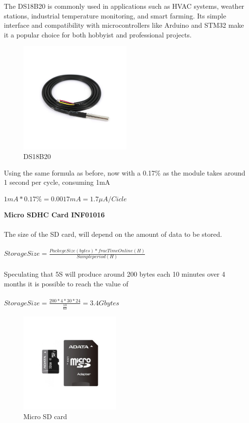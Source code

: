 The DS18B20 is commonly used in applications such as HVAC systems, weather
stations, industrial temperature monitoring, and smart farming. Its simple 
interface and compatibility with microcontrollers like Arduino and STM32 
make it a popular choice for both hobbyist and professional projects.

\begin{figure}[H]
    \centering
    \includegraphics[width=0.5\textwidth]{images/chapter/design/components/temp.png}  %
    \caption{DS18B20}
    \label{fig:DS18B20}        
\end{figure}

Using the same formula as before, now with a 0.17\% as the module takes around 1 second per cycle, consuming 1mA

\(1mA*0.17\% = 0.0017mA = 1.7\mu A/Cicle \)

\textbf{Micro SDHC Card INF01016}\\\\
The size  of the SD card, will depend on the amount of data to be stored.
\\\\
\( Storage Size = \frac{Packege Size(bytes) * frac Time Online(H)}{Sample period(H)}\)
\\\\
Speculating that 5S will produce around 200 bytes each 10 minutes over 4 months
it is possible to reach the value of 
\\\\
\( Storage Size = \frac{200 * 4 * 30 * 24}{\frac{10}{60}} = 3.4Gbytes\)

\begin{figure}[H]
    \centering
    \includegraphics[width=0.45\textwidth]{images/chapter/design/components/sdcard.png}  %
    \caption{Micro SD card}
    \label{fig:Micro SD card}        
\end{figure}

